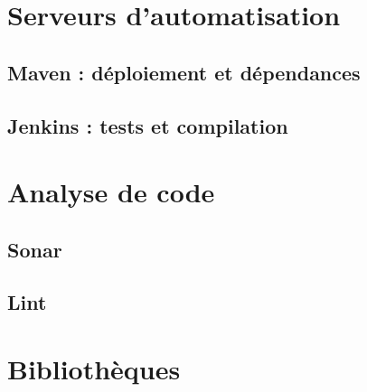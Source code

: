 \section{Serveurs d'automatisation}

\subsection{Maven : déploiement et dépendances}

\subsection{Jenkins : tests et compilation}

\section{Analyse de code}
\subsection{Sonar}
\subsection{Lint}

\section{Bibliothèques}
